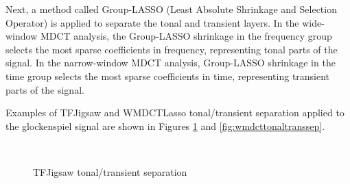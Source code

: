 \documentclass[report.tex]{subfiles}
\begin{document}
Next, a method called Group-LASSO (Least Absolute Shrinkage and Selection Operator) is applied to separate the tonal and transient layers. In the wide-window MDCT analysis, the Group-LASSO shrinkage in the frequency group selects the most sparse coefficients in frequency, representing tonal parts of the signal. In the narrow-window MDCT analysis,  Group-LASSO shrinkage in the time group selects the most sparse coefficients in time, representing transient parts of the signal.

Examples of TFJigsaw and WMDCTLasso tonal/transient separation applied to the glockenspiel signal are shown in Figures \ref{fig:tfjigsawtonaltranssep} and \ref{fig:wmdcttonaltranssep}.

\begin{figure}[ht]
	\centering
	\\
	\caption{TFJigsaw tonal/transient separation}
	\label{fig:tfjigsawtonaltranssep}
\end{figure}
\end{document}
